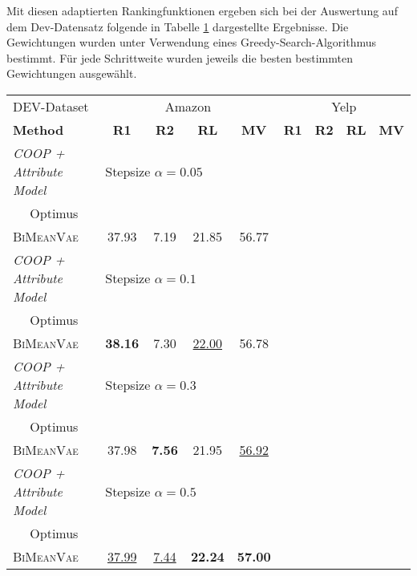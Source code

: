 Mit diesen adaptierten Rankingfunktionen ergeben sich bei der Auswertung auf dem Dev-Datensatz folgende in Tabelle \ref{dev_eval_results} dargestellte Ergebnisse.
Die Gewichtungen wurden unter Verwendung eines Greedy-Search-Algorithmus bestimmt.
Für jede Schrittweite wurden jeweils die besten bestimmten Gewichtungen ausgewählt.


\begin{table}[!h]
    \label{dev_eval_results}
    \centering
    \begin{tabular}{@{}lcccccccc@{}}
    \toprule
    DEV-Dataset                    & \multicolumn{4}{c}{Amazon} & \multicolumn{4}{c}{Yelp} \\ 
    \textbf{Method} & \textbf{R1} & \textbf{R2} & \textbf{RL} & \textbf{MV} & \textbf{R1} & \textbf{R2} & \textbf{RL} & \textbf{MV}\\ \midrule
    
    \textit{COOP + Attribute Model}        &      \multicolumn{3}{l}{Stepsize $\alpha= 0.05$}             &        &   & &     \\
    $\quad$ Optimus          &   & & & &     &      &   &      \\ 
    $\quad$ \textsc{BiMeanVae}   &  37.93 & 7.19& 21.85&56.77 &     &      &   &    \\ 
    
    \textit{COOP + Attribute Model}        &         \multicolumn{3}{l}{Stepsize $\alpha= 0.1$}            &        &   & &     \\
    $\quad$ Optimus            &   & & & &     &      &   &   \\ 
    $\quad$ \textsc{BiMeanVae} &  \textbf{38.16} & 7.30 & \underline{22.00} & 56.78&     &      &   &     \\ 

    \textit{COOP + Attribute Model}        &      \multicolumn{3}{l}{Stepsize $\alpha= 0.3$}                &        &        &   & &     \\
    $\quad$ Optimus            &   & & & &     &      &   &   \\ 
    $\quad$ \textsc{BiMeanVae} & 37.98  & \textbf{7.56} & 21.95& \underline{56.92} &     &      &   &     \\ 

    \textit{COOP + Attribute Model}        &    \multicolumn{3}{l}{Stepsize $\alpha= 0.5$}            &        &   & &     \\
       $\quad$ Optimus            &   & & & &     &      &   &   \\ 
    $\quad$ \textsc{BiMeanVae} &   \underline{37.99}&\underline{7.44} &\textbf{22.24} & \textbf{57.00}&     &      &   &     \\ \midrule



\end{tabular}
\end{table}
